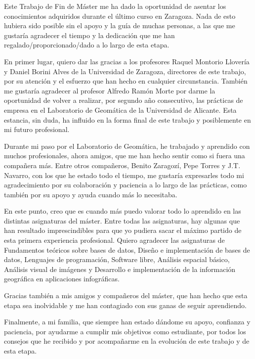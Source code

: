 
\begin{acknowledgements}

Este Trabajo de Fin de Máster me ha dado la oportunidad de asentar los conocimientos adquiridos durante el último curso en Zaragoza. Nada de esto hubiera sido posible sin el apoyo y la guía de muchas personas, a las que me gustaría agradecer el tiempo y la dedicación que me han regalado/proporcionado/dado a lo largo de esta etapa.

En primer lugar, quiero dar las gracias a los profesores Raquel Montorio Llovería y Daniel Borini Alves de la Universidad de Zaragoza, directores de este trabajo, por su atención y el esfuerzo que han hecho en cualquier circunstancia. También me gustaría agradecer al profesor Alfredo Ramón Morte por darme la oportunidad de volver a realizar, por segundo año consecutivo, las prácticas de empresa en el Laboratorio de Geomática de la Universidad de Alicante. Esta estancia, sin duda, ha influido en la forma final de este trabajo y posiblemente en mi futuro profesional.

Durante mi paso por el Laboratorio de Geomática, he trabajado y aprendido con muchos profesionales, ahora amigos, que me han hecho sentir como si fuera una compañera más. Entre otros compañeros, Benito Zaragozí, Pepe Torres y J.T. Navarro, con los que he estado todo el tiempo, me gustaría expresarles todo mi agradecimiento por su colaboración y paciencia a lo largo de las prácticas, como también por su apoyo y ayuda cuando más lo necesitaba.

En este punto, creo que es cuando más puedo valorar todo lo aprendido en las distintas asignaturas del máster. Entre todas las asignaturas, hay algunas que han resultado imprescindibles para que yo pudiera sacar el máximo partido de esta primera experiencia profesional. Quiero agradecer  las asignaturas de Fundamentos teóricos sobre bases de datos, Diseño e implementación de bases de datos, Lenguajes de programación, Software libre, Análisis espacial básico, Análisis visual de imágenes y Desarrollo e implementación de la información geográfica en aplicaciones infográficas.

Gracias también a mis amigos y compañeros del máster, que han hecho que esta etapa sea inolvidable y me han contagiado con sus ganas de seguir aprendiendo.

Finalmente, a mi familia, que siempre han estado dándome su apoyo, confianza y paciencia, por ayudarme a cumplir mis objetivos como estudiante, por todos los consejos que he recibido y por acompañarme en la evolución de este trabajo y de esta etapa.


  

\end{acknowledgements}
